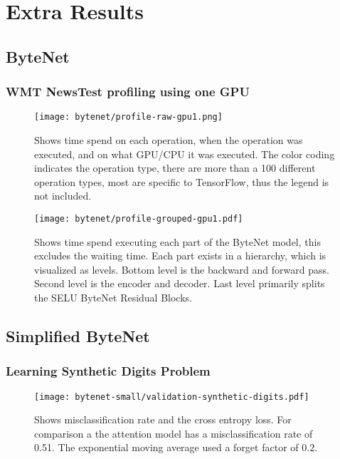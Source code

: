 \chapter{Extra Results}

\section{ByteNet}
\label{appendix:result:bytenet-profile}

\subsection{WMT NewsTest profiling using one GPU}
\begin{figure}[h]
    \centering
    \texttt{[image: bytenet/profile-raw-gpu1.png]}
    \caption{Shows time spend on each operation, when the operation was executed, and on what GPU/CPU it was executed. The color coding indicates the operation type, there are more than a 100 different operation types, most are specific to TensorFlow, thus the legend is not included.}
\end{figure}


\begin{figure}[h]
    \centering
    \texttt{[image: bytenet/profile-grouped-gpu1.pdf]}
    \caption{Shows time spend executing each part of the ByteNet model, this excludes the waiting time. Each part exists in a hierarchy, which is visualized as levels. Bottom level is the backward and forward pass. Second level is the encoder and decoder. Last level primarily splits the SELU ByteNet Residual Blocks.}
\end{figure}

\clearpage

\section{Simplified ByteNet}
\label{appendix:result:bytenet-small}
\subsection{Learning Synthetic Digits Problem}
\begin{figure}[h]
    \centering
    \texttt{[image: bytenet-small/validation-synthetic-digits.pdf]}
    \caption{Shows misclassification rate and the cross entropy loss. For comparison a the attention model has a misclassification rate of 0.51. The exponential moving average used a forget factor of $0.2$.}
\end{figure}
\clearpage

